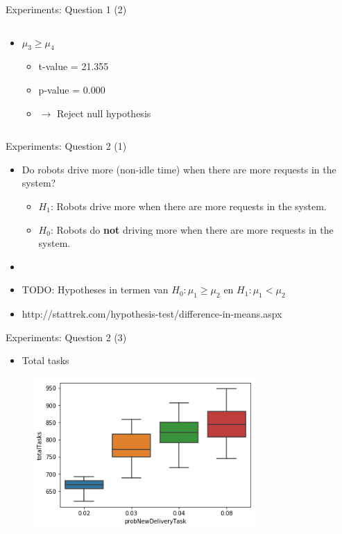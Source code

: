 \begin{frame}{Experiments: Question 1 (2)}
\begin{columns}
\begin{column}{0.5\textwidth}
\begin{itemize}
            \item $\mu_3 \geq \mu_4$
                \begin{itemize}
	                \item t-value = 21.355
	                \item p-value = 0.000
                    \item $\rightarrow$ Reject null hypothesis
                \end{itemize}
        \end{itemize}
    \end{column}

    \end{columns}
\end{frame}


\begin{frame}{Experiments: Question 2 (1)}
    \begin{itemize}
        \item Do robots drive more (non-idle time) when there are more requests in the system?
        \begin{itemize}
                \item $H_1$: Robots drive more when there are more requests in the system.
                \item $H_0$: Robots do \textbf{not} driving more when there are more requests in the system.
        \end{itemize}

        \item[]
        \item TODO: Hypotheses in termen van $H_0: \mu_1 \geq \mu_2$ en $H_1: \mu_1 < \mu_2$
        \item http://stattrek.com/hypothesis-test/difference-in-means.aspx
    \end{itemize}
\end{frame}

\begin{frame}{Experiments: Question 2 (3)}
    \begin{itemize}
        \item Total tasks
    \end{itemize}

    \begin{figure}[!hbt]
        \centering
        \includegraphics[width=8.5cm]{imgs/question2-plot3}
    \end{figure}
\end{frame}

